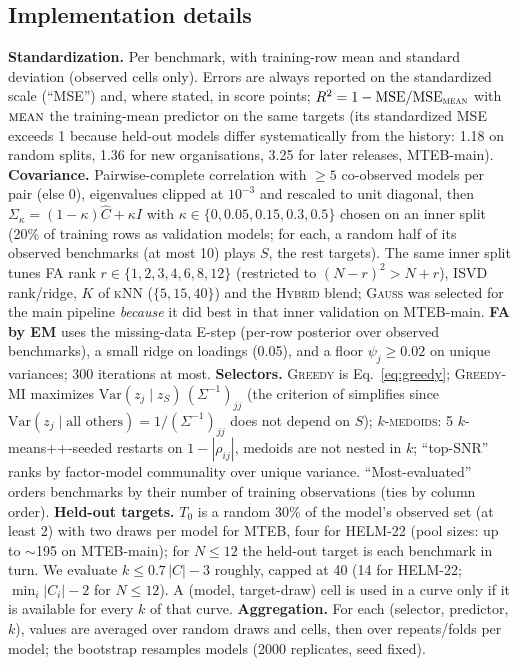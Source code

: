 \subsection{Implementation details}
\label{app:impl}
\textbf{Standardization.} Per benchmark, with training-row mean and standard deviation (observed cells only). Errors are always reported on the standardized scale (``MSE'') and, where stated, in score points; $R^2=1-\mathrm{MSE}/\mathrm{MSE}_{\textsc{mean}}$ with $\textsc{mean}$ the training-mean predictor on the same targets (its standardized MSE exceeds 1 because held-out models differ systematically from the history: 1.18 on random splits, 1.36 for new organisations, 3.25 for later releases, MTEB-main).
\textbf{Covariance.} Pairwise-complete correlation with $\ge5$ co-observed models per pair (else 0), eigenvalues clipped at $10^{-3}$ and rescaled to unit diagonal, then $\Sigma_\kappa=(1-\kappa)\hat C+\kappa I$ with $\kappa\in\{0,0.05,0.15,0.3,0.5\}$ chosen on an inner split (20\% of training rows as validation models; for each, a random half of its observed benchmarks (at most 10) plays $S$, the rest targets). The same inner split tunes FA rank $r\in\{1,2,3,4,6,8,12\}$ (restricted to $(N-r)^2>N+r$), ISVD rank/ridge, $K$ of \textsc{kNN} ($\{5,15,40\}$) and the \textsc{Hybrid} blend; \textsc{Gauss} was selected for the main pipeline \emph{because} it did best in that inner validation on MTEB-main.
\textbf{FA by EM} uses the missing-data E-step (per-row posterior over observed benchmarks), a small ridge on loadings (0.05), and a floor $\psi_j\ge0.02$ on unique variances; 300 iterations at most.
\textbf{Selectors.} \textsc{Greedy} is Eq.~\eqref{eq:greedy}; \textsc{Greedy-MI} maximizes $\mathrm{Var}(z_j\mid z_S)\,(\Sigma^{-1})_{jj}$ (the criterion of \citet{krause2008near} simplifies since $\mathrm{Var}(z_j\mid\text{all others})=1/(\Sigma^{-1})_{jj}$ does not depend on $S$); \textsc{$k$-medoids}: 5 $k$-means++-seeded restarts on $1-|\rho_{ij}|$, medoids are not nested in $k$; ``top-SNR'' ranks by factor-model communality over unique variance. ``Most-evaluated'' orders benchmarks by their number of training observations (ties by column order).
\textbf{Held-out targets.} $T_0$ is a random 30\% of the model's observed set (at least 2) with two draws per model for MTEB, four for HELM-22 (pool sizes: up to $\sim$195 on MTEB-main); for $N\le12$ the held-out target is each benchmark in turn. We evaluate $k\le0.7\,|C|-3$ roughly, capped at 40 (14 for HELM-22; $\min_i|C_i|-2$ for $N\le12$). A (model, target-draw) cell is used in a curve only if it is available for every $k$ of that curve.
\textbf{Aggregation.} For each (selector, predictor, $k$), values are averaged over random draws and cells, then over repeats/folds per model; the bootstrap resamples models (2000 replicates, seed fixed).

